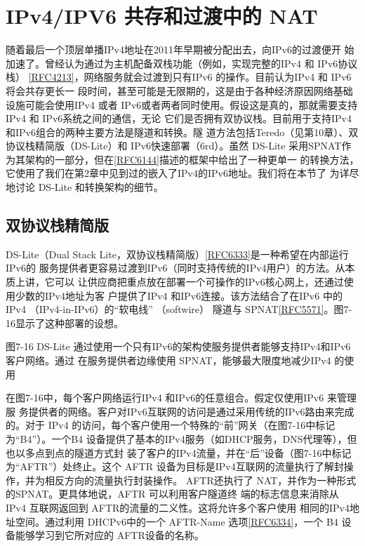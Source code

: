 \section{IPv4/IPV6 共存和过渡中的 NAT}

随着最后一个顶层单播IPv4地址在2011年早期被分配出去，向IPv6的过渡便开
始加速了。曾经认为通过为主机配备双栈功能（例如，实现完整的IPv4 和 IPv6协议栈）
\href{https://www.rfc-editor.org/rfc/rfc4213}{[RFC4213]}，网络服务就会过渡到只有IPv6 的操作。目前认为IPv4 和 IPv6将会共存更长一
段时间，甚至可能是无限期的，这是由于各种经济原因网络基础设施可能会使用IPv4 或者
IPv6或者两者同时使用。假设这是真的，那就需要支持IPv4 和 IPv6系统之间的通信，无论
它们是否拥有双协议栈。目前用于支持IPv4和IPv6组合的两种主要方法是隧道和转换。隧
道方法包括Teredo（见第10章）、双协议栈精简版（DS-Lite）和 IPv6快速部署（6rd）。虽然
DS-Lite 采用SPNAT作为其架构的一部分，但在\href{https://www.rfc-editor.org/rfc/rfc6144}{[RFC6144]}描述的框架中给出了一种更单一
的转换方法，它使用了我们在第2章中见到过的嵌入了IPv4的IPv6地址。我们将在本节了
为详尽地讨论 DS-Lite 和转换架构的细节。

\subsection{双协议栈精简版}

DS-Lite（Dual Stack Lite，双协议栈精简版）\href{https://www.rfc-editor.org/rfc/rfc6333}{[RFC6333]}是一种希望在内部运行IPv6的
服务提供者更容易过渡到IPv6（同时支持传统的IPv4用户）的方法。从本质上讲，它可以
让供应商把重点放在部署一个可操作的IPv6核心网上，还通过使用少数的IPv4地址为客
户提供了IPv4 和IPv6连接。该方法结合了在IPv6 中的IPv4 （IPv4-in-IPv6）的“软电线”
（softwire） 隧道与 SPNAT\href{https://www.rfc-editor.org/rfc/rfc5571}{[RFC5571]}。图7-16显示了这种部署的设想。

图7-16
DS-Lite 通过使用一个只有IPv6的架构使服务提供者能够支持IPv4和IPv6 客户网络。通过
在服务提供者边缘使用 SPNAT，能够最大限度地减少IPv4 的使用

在图7-16中，每个客户网络运行IPv4 和IPv6的任意组合。假定仅使用IPv6 来管理服
务提供者的网络。客户对IPv6互联网的访问是通过采用传统的IPv6路由来完成的。对于
IPv4 的访问，每个客户使用一个特殊的“前”网关（在图7-16中标记为“B4”）。一个B4
设备提供了基本的IPv4服务（如DHCP服务，DNS代理等），但也以多点到点的隧道方式封
装了客户的IPv4流量，并在“后”设备（图7-16中标记为“AFTR”）处终止。这个 AFTR
设备为目标是IPv4互联网的流量执行了解封操作，并为相反方向的流量执行封装操作。
AFTR还执行了 NAT，并作为一种形式的SPNAT。更具体地说，AFTR 可以利用客户隧道终
端的标志信息来消除从 IPv4 互联网返回到 AFTR的流量的二义性。这将允许多个客户使用
相同的IPv4地址空间。通过利用 DHCPv6中的一个 AFTR-Name 选项\href{https://www.rfc-editor.org/rfc/rfc6334}{[RFC6334]}，一个 B4
设备能够学习到它所对应的 AFTR设备的名称。

